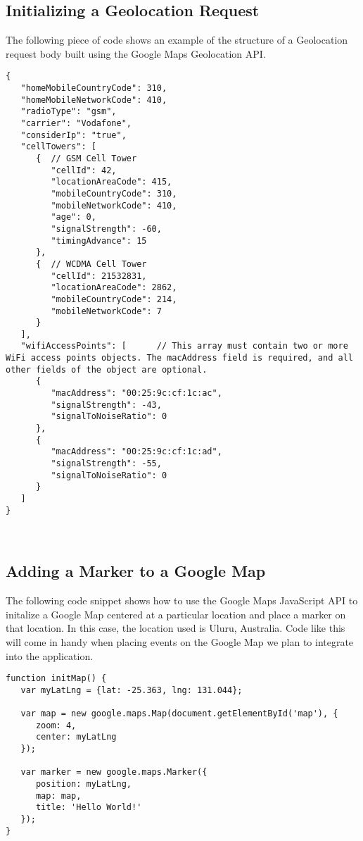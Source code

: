\documentclass[draftclsnofoot, onecolumn, 10pt, compsoc]{IEEEtran}
\begin{document}
      \subsection{Initializing a Geolocation Request}
      The following piece of code shows an example of the structure of a Geolocation request body built using the Google Maps Geolocation API.
      \begin{lstlisting}[style=c++]
{
   "homeMobileCountryCode": 310,
   "homeMobileNetworkCode": 410,
   "radioType": "gsm",
   "carrier": "Vodafone",
   "considerIp": "true",
   "cellTowers": [
      {  // GSM Cell Tower
         "cellId": 42,
         "locationAreaCode": 415,
         "mobileCountryCode": 310,
         "mobileNetworkCode": 410,
         "age": 0,
         "signalStrength": -60,
         "timingAdvance": 15
      },
      {  // WCDMA Cell Tower
         "cellId": 21532831,
         "locationAreaCode": 2862,
         "mobileCountryCode": 214,
         "mobileNetworkCode": 7
      }
   ],
   "wifiAccessPoints": [      // This array must contain two or more WiFi access points objects. The macAddress field is required, and all other fields of the object are optional.
      {
         "macAddress": "00:25:9c:cf:1c:ac",
         "signalStrength": -43,
         "signalToNoiseRatio": 0
      },
      {
         "macAddress": "00:25:9c:cf:1c:ad",
         "signalStrength": -55,
         "signalToNoiseRatio": 0
      }
   ]
}
      \end{lstlisting}
      ~\cite{GMaps_Geo}
      \subsection{Adding a Marker to a Google Map}
      The following code snippet shows how to use the Google Maps JavaScript API to initalize a Google Map centered at a particular location and place a marker on that location. In this case, the location used is Uluru, Australia. Code like this will come in handy when placing events on the Google Map we plan to integrate into the application.
      \begin{lstlisting}[style=c++]
function initMap() {
   var myLatLng = {lat: -25.363, lng: 131.044};

   var map = new google.maps.Map(document.getElementById('map'), {
      zoom: 4,
      center: myLatLng
   });

   var marker = new google.maps.Marker({
      position: myLatLng,
      map: map,
      title: 'Hello World!'
   });
}
      \end{lstlisting}
      ~\cite{GMaps_Marker}
\end{document}
